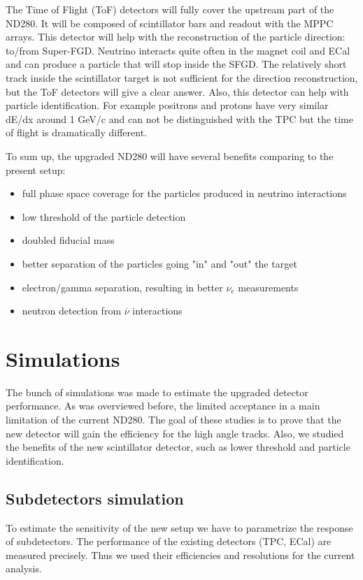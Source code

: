 \documentclass[main.tex]{subfiles}
\begin{document}
The Time of Flight (ToF) detectors will fully cover the upstream part of the ND280. It will be composed of scintillator bars and readout with the MPPC arrays. This detector will help with the reconstruction of the particle direction: to/from Super-FGD. Neutrino interacts quite often in the magnet coil and ECal and can produce a particle that will stop inside the SFGD. The relatively short track inside the scintillator target is not sufficient for the direction reconstruction, but the ToF detectors will give a clear answer. Also, this detector can help with particle identification. For example positrons and protons have very similar dE/dx around 1 GeV/c and can not be distinguished with the TPC but the time of flight is dramatically different.

To sum up, the upgraded ND280 will have several benefits comparing to the present setup:
\begin{itemize}
  \item full phase space coverage for the particles produced in neutrino interactions
  \item low threshold of the particle detection
  \item doubled fiducial mass
  \item better separation of the particles going "in" and "out" the target
  \item electron/gamma separation, resulting in better $\nu_e$ measurements
  \item neutron detection from $\overline{\nu}$ interactions
\end{itemize}

\section{Simulations}
\label{ch:up:sim}
The bunch of simulations was made to estimate the upgraded detector performance. As was overviewed before, the limited acceptance in a main limitation of the current ND280. The goal of these studies is to prove that the new detector will gain the efficiency for the high angle tracks. Also, we studied the benefits of the new scintillator detector, such as lower threshold and particle identification.

\subsection{Subdetectors simulation}
To estimate the sensitivity of the new setup we have to parametrize the response of subdetectors. The performance of the existing detectors (TPC, ECal) are measured precisely. Thus we used their efficiencies and resolutions for the current analysis.
\end{document}
